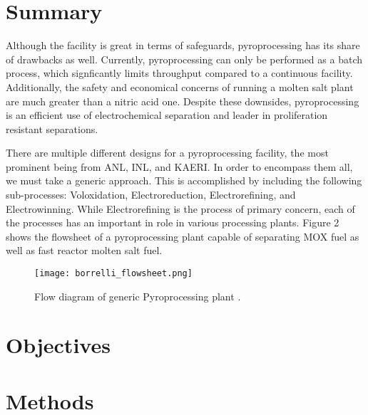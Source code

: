 \section{Summary}
Although the facility is great in terms of safeguards, pyroprocessing has its share of drawbacks as well.
Currently, pyroprocessing can only be performed as a batch process, which signficantly limits throughput compared to a continuous facility. 
Additionally, the safety and economical concerns of running a molten salt plant are much greater than a nitric acid one.
Despite these downsides, pyroprocessing is an efficient use of electrochemical separation and leader in proliferation resistant separations.

There are multiple different designs for a pyroprocessing facility, the most prominent being from ANL, INL, and KAERI. In order to encompass them all, we must take a generic approach. This is accomplished by including the following sub-processes: Voloxidation, Electroreduction, Electrorefining, and Electrowinning. While Electrorefining is the process of primary concern, each of the processes has an important in role in various processing plants. Figure 2 shows the flowsheet of a pyroprocessing plant capable of separating MOX fuel as well as fast reactor molten salt fuel.


\begin{figure}[h]
	\centering
	\texttt{[image: borrelli\_flowsheet.png]} 
	\caption{Flow diagram of generic Pyroprocessing plant \cite{borrelli_approaches_2017}.}
\end{figure}
\section{Objectives}

\section{Methods}